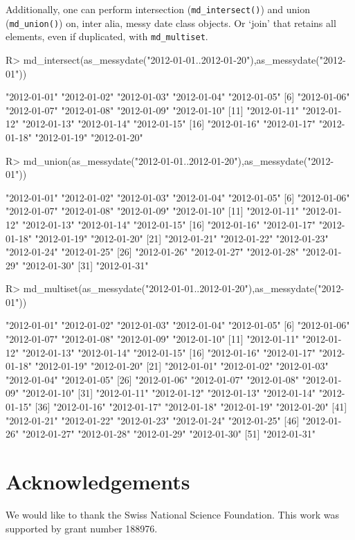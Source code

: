 \documentclass[
]{jss}
\begin{document}
Additionally, one can perform intersection (\texttt{md\_intersect()})
and union (\texttt{md\_union()}) on, inter alia, messy date class
objects. Or `join' that retains all elements, even if duplicated, with
\texttt{md\_multiset}.

\begin{CodeChunk}
\begin{CodeInput}
R> md_intersect(as_messydate("2012-01-01..2012-01-20"),as_messydate("2012-01"))
\end{CodeInput}
\begin{CodeOutput}
 [1] "2012-01-01" "2012-01-02" "2012-01-03" "2012-01-04" "2012-01-05"
 [6] "2012-01-06" "2012-01-07" "2012-01-08" "2012-01-09" "2012-01-10"
[11] "2012-01-11" "2012-01-12" "2012-01-13" "2012-01-14" "2012-01-15"
[16] "2012-01-16" "2012-01-17" "2012-01-18" "2012-01-19" "2012-01-20"
\end{CodeOutput}
\begin{CodeInput}
R> md_union(as_messydate("2012-01-01..2012-01-20"),as_messydate("2012-01"))
\end{CodeInput}
\begin{CodeOutput}
 [1] "2012-01-01" "2012-01-02" "2012-01-03" "2012-01-04" "2012-01-05"
 [6] "2012-01-06" "2012-01-07" "2012-01-08" "2012-01-09" "2012-01-10"
[11] "2012-01-11" "2012-01-12" "2012-01-13" "2012-01-14" "2012-01-15"
[16] "2012-01-16" "2012-01-17" "2012-01-18" "2012-01-19" "2012-01-20"
[21] "2012-01-21" "2012-01-22" "2012-01-23" "2012-01-24" "2012-01-25"
[26] "2012-01-26" "2012-01-27" "2012-01-28" "2012-01-29" "2012-01-30"
[31] "2012-01-31"
\end{CodeOutput}
\begin{CodeInput}
R> md_multiset(as_messydate("2012-01-01..2012-01-20"),as_messydate("2012-01"))
\end{CodeInput}
\begin{CodeOutput}
 [1] "2012-01-01" "2012-01-02" "2012-01-03" "2012-01-04" "2012-01-05"
 [6] "2012-01-06" "2012-01-07" "2012-01-08" "2012-01-09" "2012-01-10"
[11] "2012-01-11" "2012-01-12" "2012-01-13" "2012-01-14" "2012-01-15"
[16] "2012-01-16" "2012-01-17" "2012-01-18" "2012-01-19" "2012-01-20"
[21] "2012-01-01" "2012-01-02" "2012-01-03" "2012-01-04" "2012-01-05"
[26] "2012-01-06" "2012-01-07" "2012-01-08" "2012-01-09" "2012-01-10"
[31] "2012-01-11" "2012-01-12" "2012-01-13" "2012-01-14" "2012-01-15"
[36] "2012-01-16" "2012-01-17" "2012-01-18" "2012-01-19" "2012-01-20"
[41] "2012-01-21" "2012-01-22" "2012-01-23" "2012-01-24" "2012-01-25"
[46] "2012-01-26" "2012-01-27" "2012-01-28" "2012-01-29" "2012-01-30"
[51] "2012-01-31"
\end{CodeOutput}
\end{CodeChunk}

\hypertarget{acknowledgements}{%
\section{Acknowledgements}\label{acknowledgements}}

We would like to thank the Swiss National Science Foundation. This work
was supported by grant number 188976.

\renewcommand\refname{References}

\end{document}
